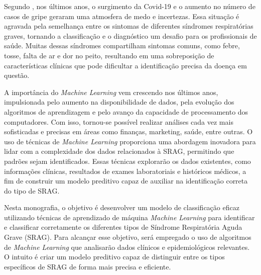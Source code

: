 \documentclass[12pt,oneside,a4paper,chapter=TITLE,
			   english,brazil]{abntex2}
\begin{document}
Segundo , nos últimos anos, o surgimento da Covid-19 e o aumento no número de casos de gripe geraram uma atmosfera de medo e incertezas. Essa situação é agravada pela semelhança entre os sintomas de diferentes síndromes respiratórias graves, tornando a classificação e o diagnóstico um desafio para os profissionais de saúde. Muitas dessas síndromes compartilham sintomas comuns, como febre, tosse, falta de ar e dor no peito, resultando em uma sobreposição de características clínicas que pode dificultar a identificação precisa da doença em questão.

A importância do \textit{Machine Learning} vem crescendo nos últimos anos, impulsionada pelo aumento na disponibilidade de dados, pela evolução dos algoritmos de aprendizagem e pelo avanço da capacidade de processamento dos computadores. Com isso, tornou-se possível realizar análises cada vez mais sofisticadas e precisas em áreas como finanças, marketing, saúde, entre outras. O uso de técnicas de \textit{Machine Learning} proporciona uma abordagem inovadora para lidar com a complexidade dos dados relacionados à SRAG, permitindo que padrões  sejam identificados. Essas técnicas explorarão os dados existentes, como informações clínicas, resultados de exames laboratoriais e históricos médicos, a fim de construir um modelo preditivo capaz de auxiliar na identificação correta do tipo de SRAG.  



Nesta monografia, o objetivo é desenvolver um modelo de classificação eficaz utilizando técnicas de aprendizado de máquina \textit{Machine Learning} para identificar e classificar corretamente os diferentes tipos de Síndrome Respiratória Aguda Grave (SRAG). Para alcançar esse objetivo, será empregado o uso de algoritmos de \textit{Machine Learning} que analisarão dados clínicos e epidemiológicos relevantes. O intuito é criar um modelo preditivo capaz de distinguir entre os tipos específicos de SRAG de forma mais precisa e eficiente.


\end{document}
